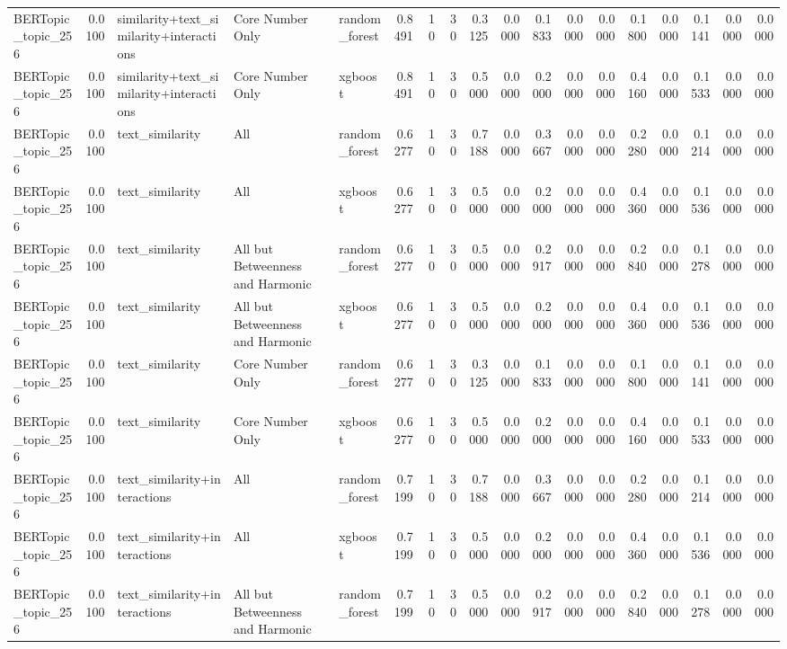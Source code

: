 \begin{tabular}{lrlllrrrrrrrrrrrrr}
BERTopic_topic_256 & 0.0100 & similarity+text_similarity+interactions & Core Number Only & random_forest & 0.8491 & 10 & 30 & 0.3125 & 0.0000 & 0.1833 & 0.0000 & 0.0000 & 0.1800 & 0.0000 & 0.1141 & 0.0000 & 0.0000 \\
BERTopic_topic_256 & 0.0100 & similarity+text_similarity+interactions & Core Number Only & xgboost & 0.8491 & 10 & 30 & 0.5000 & 0.0000 & 0.2000 & 0.0000 & 0.0000 & 0.4160 & 0.0000 & 0.1533 & 0.0000 & 0.0000 \\
BERTopic_topic_256 & 0.0100 & text_similarity & All & random_forest & 0.6277 & 10 & 30 & 0.7188 & 0.0000 & 0.3667 & 0.0000 & 0.0000 & 0.2280 & 0.0000 & 0.1214 & 0.0000 & 0.0000 \\
BERTopic_topic_256 & 0.0100 & text_similarity & All & xgboost & 0.6277 & 10 & 30 & 0.5000 & 0.0000 & 0.2000 & 0.0000 & 0.0000 & 0.4360 & 0.0000 & 0.1536 & 0.0000 & 0.0000 \\
BERTopic_topic_256 & 0.0100 & text_similarity & All but Betweenness and Harmonic & random_forest & 0.6277 & 10 & 30 & 0.5000 & 0.0000 & 0.2917 & 0.0000 & 0.0000 & 0.2840 & 0.0000 & 0.1278 & 0.0000 & 0.0000 \\
BERTopic_topic_256 & 0.0100 & text_similarity & All but Betweenness and Harmonic & xgboost & 0.6277 & 10 & 30 & 0.5000 & 0.0000 & 0.2000 & 0.0000 & 0.0000 & 0.4360 & 0.0000 & 0.1536 & 0.0000 & 0.0000 \\
BERTopic_topic_256 & 0.0100 & text_similarity & Core Number Only & random_forest & 0.6277 & 10 & 30 & 0.3125 & 0.0000 & 0.1833 & 0.0000 & 0.0000 & 0.1800 & 0.0000 & 0.1141 & 0.0000 & 0.0000 \\
BERTopic_topic_256 & 0.0100 & text_similarity & Core Number Only & xgboost & 0.6277 & 10 & 30 & 0.5000 & 0.0000 & 0.2000 & 0.0000 & 0.0000 & 0.4160 & 0.0000 & 0.1533 & 0.0000 & 0.0000 \\
BERTopic_topic_256 & 0.0100 & text_similarity+interactions & All & random_forest & 0.7199 & 10 & 30 & 0.7188 & 0.0000 & 0.3667 & 0.0000 & 0.0000 & 0.2280 & 0.0000 & 0.1214 & 0.0000 & 0.0000 \\
BERTopic_topic_256 & 0.0100 & text_similarity+interactions & All & xgboost & 0.7199 & 10 & 30 & 0.5000 & 0.0000 & 0.2000 & 0.0000 & 0.0000 & 0.4360 & 0.0000 & 0.1536 & 0.0000 & 0.0000 \\
BERTopic_topic_256 & 0.0100 & text_similarity+interactions & All but Betweenness and Harmonic & random_forest & 0.7199 & 10 & 30 & 0.5000 & 0.0000 & 0.2917 & 0.0000 & 0.0000 & 0.2840 & 0.0000 & 0.1278 & 0.0000 & 0.0000 \\

\end{tabular}
